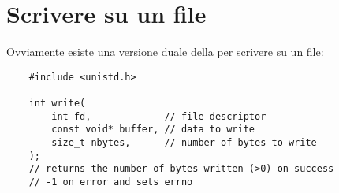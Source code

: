 \section{Scrivere su un file}

Ovviamente esiste una versione duale della  per scrivere su un file:
\begin{verbatim}
    #include <unistd.h>

    int write(
        int fd,             // file descriptor
        const void* buffer, // data to write
        size_t nbytes,      // number of bytes to write
    );
    // returns the number of bytes written (>0) on success
    // -1 on error and sets errno
\end{verbatim}